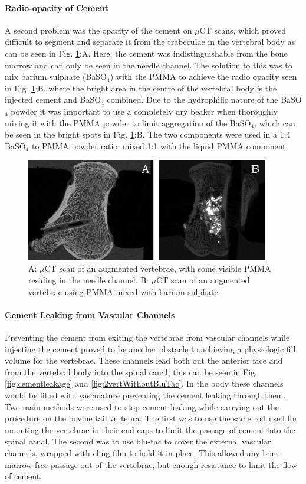 \paragraph{Radio-opacity of Cement}
A second problem was the opacity of the cement on $\mu$CT scans, which proved difficult to segment and separate it from the trabeculae in the vertebral body as can be seen in Fig. \ref{fig:withWithoutBaSO4}:A. Here, the cement was indistinguishable from the bone marrow and can only be seen in the needle channel. The solution to this was to mix barium sulphate (BaSO$_4$) with the PMMA to achieve the radio opacity seen in Fig. \ref{fig:withWithoutBaSO4}:B, where the bright area in the centre of the vertebral body is the injected cement and BaSO$_4$ combined. Due to the hydrophilic nature of the BaSO$_4$ powder it was important to use a completely dry beaker when thoroughly mixing it with the PMMA powder to limit aggregation of the BaSO$_4$, which can be seen in the bright spots in Fig. \ref{fig:withWithoutBaSO4}:B. The two components were used in a 1:4 BaSO$_4$ to PMMA powder ratio, mixed 1:1 with the liquid PMMA component.

\begin{figure}[ht!]
\centering
\includegraphics[width=4.18472in]{images/withWithoutBaSo4.png}
\caption{A: $\mu$CT scan of an augmented vertebrae, with some visible PMMA residing in the needle channel. B: $\mu$CT scan of an augmented vertebrae using PMMA mixed with barium sulphate.}
\label{fig:withWithoutBaSO4}
\end{figure}
\paragraph{Cement Leaking from Vascular Channels}
Preventing the cement from exiting the vertebrae from vascular channels while injecting the cement proved to be another obstacle to achieving a physiologic fill volume for the vertebrae. These channels lead both out the anterior face and from the vertebral body into the spinal canal, this can be seen in Fig. \ref{fig:cementleakage} and \ref{fig:2vertWithoutBluTac}. In the body these channels would be filled with vasculature preventing the cement leaking through them. Two main methods were used to stop cement leaking while carrying out the procedure on the bovine tail vertebra. The first was to use the same rod used for mounting the vertebrae in their end-caps to limit the passage of cement into the spinal canal. The second was to use blu-tac to cover the external vascular channels, wrapped with cling-film to hold it in place. This allowed any bone marrow free passage out of the vertebrae, but enough resistance to limit the flow of cement.

